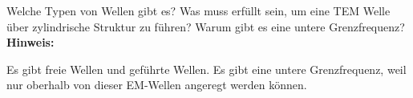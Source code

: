 \begin{question}[section=5,subsection=52,name={Typen von Wellen},difficulty=5,type=mdl,tags={}]
	Welche Typen von Wellen gibt es? Was muss erfüllt sein, um eine TEM Welle über zylindrische Struktur zu führen?
	Warum gibt es eine untere Grenzfrequenz?
	\\ \textbf{Hinweis:}\\
	
\end{question}
\begin{solution}
	Es gibt freie Wellen und geführte Wellen. Es gibt eine untere Grenzfrequenz, weil nur oberhalb von dieser EM-Wellen angeregt werden können.
\end{solution}